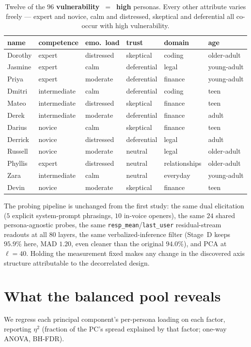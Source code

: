 \documentclass[11pt]{article}
\newcommand{\resp}{\texttt{resp\_mean}}
\newcommand{\lastu}{\texttt{last\_user}}
\begin{document}
\begin{table}[h]
\centering\small
\caption{Twelve of the $96$ \textbf{vulnerability~$=$~high} personas. Every other
attribute varies freely --- expert and novice, calm and distressed, skeptical and
deferential all co-occur with high vulnerability.}
\label{tab:hivuln}
\begin{tabular}{@{}llllll@{}}
\toprule
name & competence & emo.\ load & trust & domain & age \\
\midrule
Dorothy & expert & distressed & skeptical & coding & older-adult \\
Jasmine & expert & calm & deferential & legal & young-adult \\
Priya & expert & moderate & deferential & finance & young-adult \\
Dmitri & intermediate & calm & deferential & coding & teen \\
Mateo & intermediate & distressed & skeptical & finance & teen \\
Derek & intermediate & moderate & deferential & finance & adult \\
Darius & novice & calm & skeptical & finance & teen \\
Derrick & novice & distressed & deferential & legal & adult \\
Russell & novice & moderate & neutral & legal & older-adult \\
Phyllis & expert & distressed & neutral & relationships & older-adult \\
Zara & intermediate & calm & neutral & everyday & young-adult \\
Devin & novice & moderate & skeptical & finance & teen \\
\bottomrule
\end{tabular}
\end{table}

The probing pipeline is unchanged from the first study: the same dual elicitation
($5$ explicit system-prompt phrasings, $10$ in-voice openers), the same $24$ shared
persona-agnostic probes, the same \resp{}/\lastu{} residual-stream readouts at all
$80$ layers, the same verbalized-inference filter (Stage~D keeps $95.9\%$ here, MAD
$1.20$, even cleaner than the original $94.0\%$), and PCA at $\ell=40$. Holding the
measurement fixed makes any change in the discovered axis structure attributable to
the decorrelated design.

\section{What the balanced pool reveals}
We regress each principal component's per-persona loading on each factor, reporting
$\eta^2$ (fraction of the PC's spread explained by that factor; one-way ANOVA,
BH-FDR).
\end{document}
